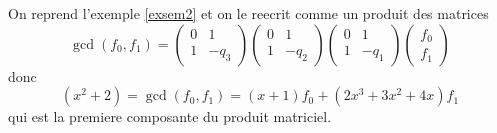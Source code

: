 \begin{example}
On  reprend l'exemple \ref{exsem2} et on le reecrit comme un produit des matrices
$$
\gcd(f_{0},f_{1})=\begin{pmatrix}
0 & 1 \\
1 & -q_{3}
\end{pmatrix}\begin{pmatrix}
0 & 1 \\
1 & -q_{2}
\end{pmatrix}\begin{pmatrix}
0 & 1 \\
1 & -q_{1}
\end{pmatrix}\begin{pmatrix}
f_{0} \\
f_{1}
\end{pmatrix}
$$
donc
$$
(x^{2}+2)=\gcd(f_{0},f_{1})=(x+1)f_{0}+(2x^{3}+3x^{2}+4x)f_{1}
$$
qui est la premiere composante du produit matriciel.
\end{example}

